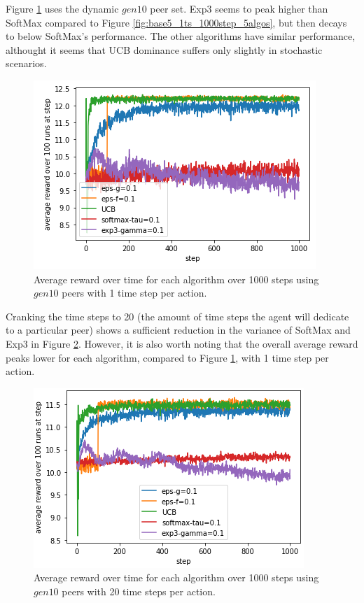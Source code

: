 \documentclass{article}
\begin{document}
Figure \ref{fig:gen10_1ts_1000step_5algos} uses the dynamic $gen10$ peer set. Exp3 seems to peak higher than SoftMax compared to Figure \ref{fig:base5_1ts_1000step_5algos}, 
but then decays to below SoftMax's performance. The other algorithms have similar performance, althought it seems that UCB dominance suffers only slightly in stochastic 
scenarios. 
\begin{figure}[h]
    \centering
    \includegraphics[width=1\linewidth]{figs/gen10_1ts_1000step_5algos.png}
    \caption{Average reward over time for each algorithm over 1000 steps using $gen10$ peers with 1 time step per action.}
    \label{fig:gen10_1ts_1000step_5algos}
\end{figure}

Cranking the time steps to 20 (the amount of time steps the agent will dedicate to a particular peer) shows a sufficient reduction in the variance of SoftMax and Exp3 in 
Figure \ref{fig:gen10_20ts_1000step_5algos}. However, it is also worth noting that the overall average reward peaks lower for each algorithm, compared to 
Figure \ref{fig:gen10_1ts_1000step_5algos}, with 1 time step per action.
\begin{figure}[h]
    \centering
    \includegraphics[width=1\linewidth]{figs/gen10_20ts_1000step_5algos.png}
    \caption{Average reward over time for each algorithm over 1000 steps using $gen10$ peers with 20 time steps per action.}
    \label{fig:gen10_20ts_1000step_5algos}
\end{figure}
\end{document}
